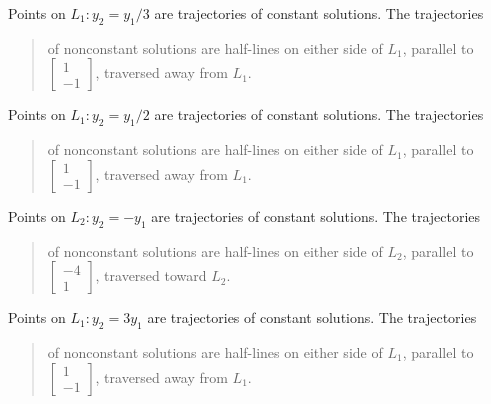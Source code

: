 Points on $L_{1}:y_{2}=y_{1}/3$ are trajectories of constant solutions.
The trajectories
\begin{quote}of nonconstant solutions are half-lines on either
side of $L_{1}$, parallel to
$\left[\begin{array}{r}
1\\{-1}
\end{array}\right]$,
traversed away
from
$L_{1}$.
\end{quote}

Points on $L_{1}:y_{2}=y_{1}/2$ are trajectories of constant solutions.
The trajectories
\begin{quote}
of nonconstant solutions are half-lines on either
side of $L_{1}$, parallel to
$\left[\begin{array}{r}
1\\-1
\end{array}\right]$,
traversed away from $L_{1}$.
\end{quote}

Points on $L_{2}:y_{2}=-y_{1}$ are trajectories of constant solutions.
The trajectories
\begin{quote}of nonconstant solutions are half-lines on either
side of $L_{2}$, parallel to
$\left[\begin{array}{r}
-4\\1
\end{array}\right]$,
 traversed toward
$L_{2}$.
\end{quote}

Points on $L_{1}:y_{2}=3y_{1}$ are trajectories of constant solutions.
The trajectories
\begin{quote}of nonconstant solutions are half-lines on either
side of $L_{1}$, parallel to
$\left[\begin{array}{r}
1\\{-1}
\end{array}\right]$,
traversed away from
$L_{1}$.
\end{quote}
